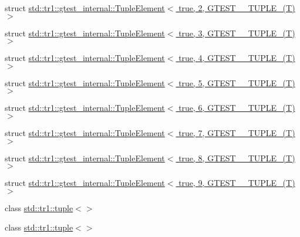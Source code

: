 \begin{DoxyCompactItemize}
struct \hyperlink{structstd_1_1tr1_1_1gtest__internal_1_1_tuple_element_3_01true_00_012_00_01_g_t_e_s_t__10___t_u_p_l_e___07_t_08_01_4}{std\+::tr1\+::gtest\+\_\+internal\+::\+Tuple\+Element$<$ true, 2, G\+T\+E\+S\+T\+\_\+\_\+\+T\+U\+P\+L\+E\+\_\+(\+T) $>$}
\item 
struct \hyperlink{structstd_1_1tr1_1_1gtest__internal_1_1_tuple_element_3_01true_00_013_00_01_g_t_e_s_t__10___t_u_p_l_e___07_t_08_01_4}{std\+::tr1\+::gtest\+\_\+internal\+::\+Tuple\+Element$<$ true, 3, G\+T\+E\+S\+T\+\_\+\_\+\+T\+U\+P\+L\+E\+\_\+(\+T) $>$}
\item 
struct \hyperlink{structstd_1_1tr1_1_1gtest__internal_1_1_tuple_element_3_01true_00_014_00_01_g_t_e_s_t__10___t_u_p_l_e___07_t_08_01_4}{std\+::tr1\+::gtest\+\_\+internal\+::\+Tuple\+Element$<$ true, 4, G\+T\+E\+S\+T\+\_\+\_\+\+T\+U\+P\+L\+E\+\_\+(\+T) $>$}
\item 
struct \hyperlink{structstd_1_1tr1_1_1gtest__internal_1_1_tuple_element_3_01true_00_015_00_01_g_t_e_s_t__10___t_u_p_l_e___07_t_08_01_4}{std\+::tr1\+::gtest\+\_\+internal\+::\+Tuple\+Element$<$ true, 5, G\+T\+E\+S\+T\+\_\+\_\+\+T\+U\+P\+L\+E\+\_\+(\+T) $>$}
\item 
struct \hyperlink{structstd_1_1tr1_1_1gtest__internal_1_1_tuple_element_3_01true_00_016_00_01_g_t_e_s_t__10___t_u_p_l_e___07_t_08_01_4}{std\+::tr1\+::gtest\+\_\+internal\+::\+Tuple\+Element$<$ true, 6, G\+T\+E\+S\+T\+\_\+\_\+\+T\+U\+P\+L\+E\+\_\+(\+T) $>$}
\item 
struct \hyperlink{structstd_1_1tr1_1_1gtest__internal_1_1_tuple_element_3_01true_00_017_00_01_g_t_e_s_t__10___t_u_p_l_e___07_t_08_01_4}{std\+::tr1\+::gtest\+\_\+internal\+::\+Tuple\+Element$<$ true, 7, G\+T\+E\+S\+T\+\_\+\_\+\+T\+U\+P\+L\+E\+\_\+(\+T) $>$}
\item 
struct \hyperlink{structstd_1_1tr1_1_1gtest__internal_1_1_tuple_element_3_01true_00_018_00_01_g_t_e_s_t__10___t_u_p_l_e___07_t_08_01_4}{std\+::tr1\+::gtest\+\_\+internal\+::\+Tuple\+Element$<$ true, 8, G\+T\+E\+S\+T\+\_\+\_\+\+T\+U\+P\+L\+E\+\_\+(\+T) $>$}
\item 
struct \hyperlink{structstd_1_1tr1_1_1gtest__internal_1_1_tuple_element_3_01true_00_019_00_01_g_t_e_s_t__10___t_u_p_l_e___07_t_08_01_4}{std\+::tr1\+::gtest\+\_\+internal\+::\+Tuple\+Element$<$ true, 9, G\+T\+E\+S\+T\+\_\+\_\+\+T\+U\+P\+L\+E\+\_\+(\+T) $>$}
\item 
class \hyperlink{classstd_1_1tr1_1_1tuple_3_4}{std\+::tr1\+::tuple$<$$>$}
\item 
class \hyperlink{singletonstd_1_1tr1_1_1tuple}{std\+::tr1\+::tuple$<$$>$}

\end{DoxyCompactItemize}
